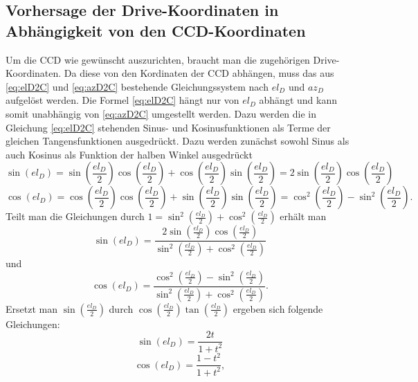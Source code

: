 \subsection{Vorhersage der Drive-Koordinaten in Abhängigkeit von den CCD-Koordinaten}
Um die CCD wie gewünscht auszurichten, braucht man die zugehörigen Drive-Koordinaten. Da diese von den Kordinaten der CCD abhängen, muss das aus \ref{eq:elD2C} und \ref{eq:azD2C} bestehende Gleichungssystem nach $el_D$ und $az_D$ aufgelöst werden. Die Formel \ref{eq:elD2C} hängt nur von $el_D$ abhängt und kann somit unabhängig von \ref{eq:azD2C} umgestellt werden. Dazu werden die in Gleichung \ref{eq:elD2C} stehenden Sinus- und Kosinusfunktionen als Terme der gleichen Tangensfunktionen ausgedrückt. Dazu werden zunächst sowohl Sinus als auch Kosinus als Funktion der halben Winkel ausgedrückt
\begin{equation}
\sin\left( el_D \right) = \sin\left( \frac{el_D}{2} \right)\cos\left( \frac{el_D}{2} \right)+\cos\left( \frac{el_D}{2} \right)\sin\left( \frac{el_D}{2} \right)=2\sin\left( \frac{el_D}{2} \right)\cos\left( \frac{el_D}{2} \right)
\end{equation}
\begin{equation}
\cos\left( el_D \right) = \cos\left( \frac{el_D}{2} \right)\cos\left( \frac{el_D}{2} \right)+\sin\left( \frac{el_D}{2} \right)\sin\left( \frac{el_D}{2} \right)=\cos^2\left( \frac{el_D}{2} \right)-\sin^2\left( \frac{el_D}{2} \right).
\end{equation}
Teilt man die Gleichungen durch $1=\sin^2\left( \frac{el_D}{2} \right)+\cos^2\left( \frac{el_D}{2} \right)$ erhält man
\begin{equation}
\sin\left( el_D \right)=\frac{2\sin\left( \frac{el_D}{2} \right)\cos\left( \frac{el_D}{2} \right)}{\sin^2\left( \frac{el_D}{2} \right)+\cos^2\left( \frac{el_D}{2} \right)}
\end{equation}
und
\begin{equation}
\cos\left( el_D \right)=\frac{\cos^2\left( \frac{el_D}{2} \right)-\sin^2\left( \frac{el_D}{2} \right)}{\sin^2\left( \frac{el_D}{2} \right)+\cos^2\left( \frac{el_D}{2} \right)}.
\end{equation}
Ersetzt man $\sin\left(\frac{el_D}{2}\right)$ durch $\cos\left(\frac{el_D}{2}\right)\tan\left(\frac{el_D}{2}\right)$ ergeben sich folgende Gleichungen:
\begin{equation}
\sin\left(el_D\right)=\frac{2t}{1+t^2}
\label{eq:sint}
\end{equation}
\begin{equation}
\cos\left(el_D\right)=\frac{1-t^2}{1+t^2},
\label{eq:cost}
\end{equation}
